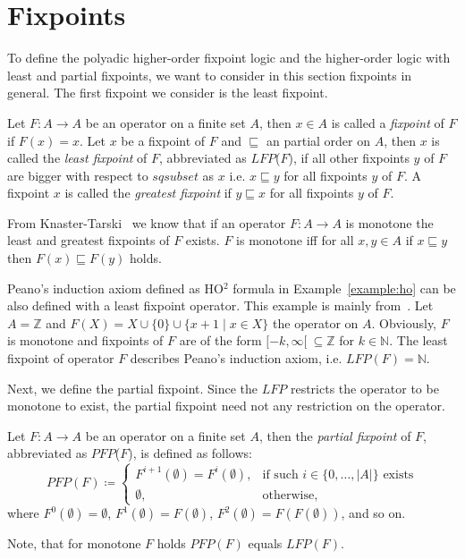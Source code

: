 
\section{Fixpoints}\label{sec:fixpoints}

To define the polyadic higher-order fixpoint logic and the higher-order logic with least and partial fixpoints, we want to consider in this section fixpoints in general. The first fixpoint we consider is the least fixpoint.

\begin{definition}
   Let $F\colon A \rightarrow A$ be an operator on a finite set $A$, then $x \in A$
   is called a \emph{fixpoint} of $F$ if $F(x) = x$. Let $x$ be a fixpoint of $F$ and $\sqsubseteq$ an partial order on $A$, then $x$ is called the \emph{least
   fixpoint} of $F$, abbreviated as $\mathit{LFP}$($F$), if all other fixpoints $y$ of $F$ are bigger with respect to $sqsubset$ as $x$ i.e. $x
   \sqsubseteq y$ for all fixpoints $y$ of $F$. A fixpoint $x$ is called the \emph{greatest fixpoint} if $y \sqsubseteq x$ for all fixpoints $y$ of $F$.
\end{definition}

From Knaster-Tarski~\cite{tarski1955lattice} we know that if an operator $F\colon A \rightarrow 
A$ is monotone the least and greatest fixpoints of $F$ exists. $F$ is monotone iff for all $x, y
 \in A$ if $x \sqsubseteq y$ then $F(x) \sqsubseteq F(y)$ holds.

\begin{example}
    \label{example:lfp}
    Peano's induction axiom defined as HO$^2$ formula in Example~\ref{example:ho} can be also defined with a least
    fixpoint operator. This example is mainly from~\cite{hetzl2017higher}. Let $A = \mathbb{Z}$ and $F(X) = X \cup \{0\} \cup
    \{x + 1 \mid x \in X\}$ the operator on $A$. Obviously, $F$ is monotone and fixpoints of $F$ are of the form
    $[-k, \infty[~\subseteq\mathbb{Z}$ for $k \in \mathbb{N}$. The least fixpoint of operator $F$ describes Peano's
    induction axiom, i.e. $\mathit{LFP}(F) = \mathbb{N}$.
\end{example}

Next, we define the partial fixpoint. Since the
$\mathit{LFP}$ restricts the operator to be monotone to exist, the partial fixpoint need not any
restriction on the operator.

\begin{definition}
    Let $F\colon A \rightarrow A$ be an operator on a finite set $A$, then the \emph{partial
    fixpoint} of $F$, abbreviated as $\mathit{PFP}$($F$), is defined as follows:
    \[\mathit{PFP}(F)\coloneqq\begin{cases}
               F^{i+1}(\emptyset)=F^i(\emptyset),  & \text{if such } i \in \{0,\dots,|A|\} \text{ exists}\\
               \emptyset, & \text{otherwise,}
    \end{cases}\]
    where $F^0(\emptyset) = \emptyset$, $F^1(\emptyset) = F(\emptyset)$, $F^2(\emptyset) = F(F(\emptyset))$, and so on.
\end{definition}

Note, that for monotone $F$ holds $\mathit{PFP}(F)$ equals $\mathit{LFP}(F)$.	